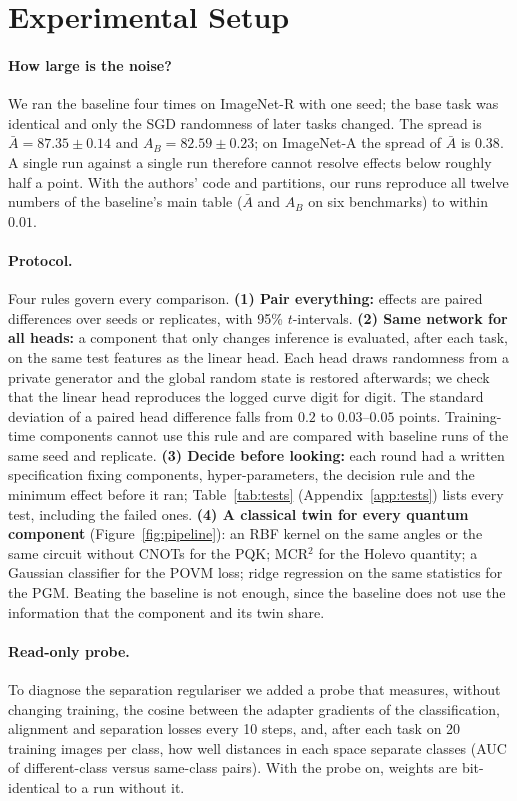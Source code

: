 \section{Experimental Setup}
\label{sec:setup}

\paragraph{How large is the noise?}
We ran the baseline four times on ImageNet-R with one seed; the base task was
identical and only the SGD randomness of later tasks changed. The spread is
$\bar A=87.35\pm0.14$ and $A_B=82.59\pm0.23$; on ImageNet-A the spread of
$\bar A$ is $0.38$. A single run against a single run therefore cannot resolve
effects below roughly half a point. With the authors' code and partitions, our
runs reproduce all twelve numbers of the baseline's main table ($\bar A$ and
$A_B$ on six benchmarks) to within $0.01$.

\paragraph{Protocol.}
Four rules govern every comparison.
\textbf{(1) Pair everything:} effects are paired differences over seeds or
replicates, with 95\% $t$-intervals.
\textbf{(2) Same network for all heads:} a component that only changes
inference is evaluated, after each task, on the same test features as the
linear head. Each head draws randomness from a private generator and the
global random state is restored afterwards; we check that the linear head
reproduces the logged curve digit for digit. The standard deviation of a
paired head difference falls from $0.2$ to $0.03$--$0.05$ points.
Training-time components cannot use this rule and are compared with baseline
runs of the same seed and replicate.
\textbf{(3) Decide before looking:} each round had a written specification
fixing components, hyper-parameters, the decision rule and the minimum effect
before it ran; Table~\ref{tab:tests} (Appendix~\ref{app:tests}) lists every
test, including the failed ones.
\textbf{(4) A classical twin for every quantum component}
(Figure~\ref{fig:pipeline}): an RBF kernel on the same angles or the same
circuit without CNOTs for the PQK; MCR$^2$ for the Holevo quantity; a Gaussian
classifier for the POVM loss; ridge regression on the same statistics for the
PGM. Beating the baseline is not enough, since the baseline does not use the
information that the component and its twin share.

\paragraph{Read-only probe.}
To diagnose the separation regulariser we added a probe that measures,
without changing training, the cosine between the adapter gradients of the
classification, alignment and separation losses every 10 steps, and, after
each task on 20 training images per class, how well distances in each space
separate classes (AUC of different-class versus same-class pairs). With the
probe on, weights are bit-identical to a run without it.

